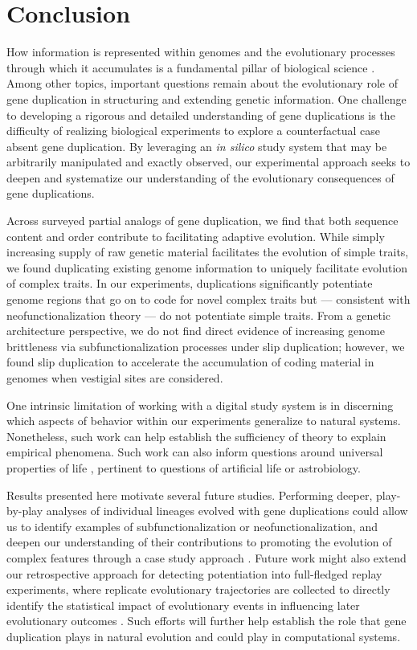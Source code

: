 \section{Conclusion} \label{sec:conclusion}

How information is represented within genomes and the evolutionary processes through which it accumulates is a fundamental pillar of biological science \citep{adami2024evolution}.
Among other topics, important questions remain about the evolutionary role of gene duplication in structuring and extending genetic information.
One challenge to developing a rigorous and detailed understanding of gene duplications is the difficulty of realizing biological experiments to explore a counterfactual case absent gene duplication.
By leveraging an \textit{in silico} study system that may be arbitrarily manipulated and exactly observed, our experimental approach seeks to deepen and systematize our understanding of the evolutionary consequences of gene duplications.

Across surveyed partial analogs of gene duplication, we find that both sequence content and order contribute to facilitating adaptive evolution.
While simply increasing supply of raw genetic material facilitates the evolution of simple traits, we found duplicating existing genome information to uniquely facilitate evolution of complex traits.
In our experiments, duplications significantly potentiate genome regions that go on to code for novel complex traits but --- consistent with neofunctionalization theory --- do not potentiate simple traits.
From a genetic architecture perspective, we do not find direct evidence of increasing genome brittleness via subfunctionalization processes under slip duplication; however, we found slip duplication to accelerate the accumulation of coding material in genomes when vestigial sites are considered.

One intrinsic limitation of working with a digital study system is in discerning which aspects of behavior within our experiments generalize to natural systems.
Nonetheless, such work can help establish the sufficiency of theory to explain empirical phenomena.
Such work can also inform questions around universal properties of life \citep{dorin2024what}, pertinent to questions of artificial life or astrobiology.

Results presented here motivate several future studies.
Performing deeper, play-by-play analyses of individual lineages evolved with gene duplications could allow us to identify examples of subfunctionalization or neofunctionalization, and deepen our understanding of their contributions to promoting the evolution of complex features through a case study approach \citep{mcphee2018detailed}.
Future work might also extend our retrospective approach for detecting potentiation into full-fledged replay experiments, where replicate evolutionary trajectories are collected to directly identify the statistical impact of evolutionary events in influencing later evolutionary outcomes \citep{blount2018contingency,Ferguson2023}.
Such efforts will further help establish the role that gene duplication plays in natural evolution and could play in computational systems.

